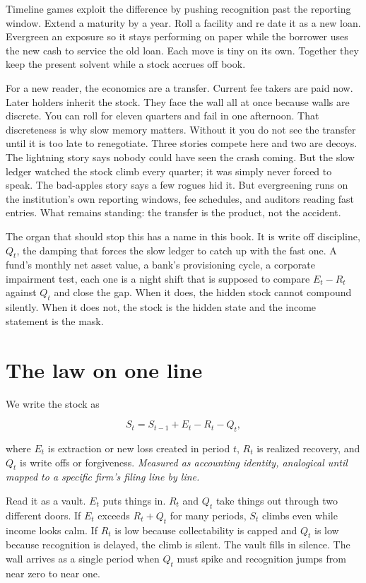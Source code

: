 Timeline games exploit the difference by pushing recognition past the reporting window. Extend a maturity by a year. Roll a facility and re date it as a new loan. Evergreen an exposure so it stays performing on paper while the borrower uses the new cash to service the old loan. Each move is tiny on its own. Together they keep the present solvent while a stock accrues off book.

For a new reader, the economics are a transfer. Current fee takers are paid now. Later holders inherit the stock. They face the wall all at once because walls are discrete. You can roll for eleven quarters and fail in one afternoon. That discreteness is why slow memory matters. Without it you do not see the transfer until it is too late to renegotiate. Three stories compete here and two are decoys. The lightning story says nobody could have seen the crash coming. But the slow ledger watched the stock climb every quarter; it was simply never forced to speak. The bad-apples story says a few rogues hid it. But evergreening runs on the institution's own reporting windows, fee schedules, and auditors reading fast entries. What remains standing: the transfer is the product, not the accident.

The organ that should stop this has a name in this book. It is write off discipline, $Q_t$, the damping that forces the slow ledger to catch up with the fast one. A fund's monthly net asset value, a bank's provisioning cycle, a corporate impairment test, each one is a night shift that is supposed to compare $E_t - R_t$ against $Q_t$ and close the gap. When it does, the hidden stock cannot compound silently. When it does not, the stock is the hidden state and the income statement is the mask.

\section{The law on one line}

We write the stock as

\begin{equation}
S_t = S_{t-1} + E_t - R_t - Q_t,
\label{eq:Stimeline}
\end{equation}

where $E_t$ is extraction or new loss created in period $t$, $R_t$ is realized recovery, and $Q_t$ is write offs or forgiveness. \textit{Measured as accounting identity, analogical until mapped to a specific firm's filing line by line.}

Read it as a vault. $E_t$ puts things in. $R_t$ and $Q_t$ take things out through two different doors. If $E_t$ exceeds $R_t + Q_t$ for many periods, $S_t$ climbs even while income looks calm. If $R_t$ is low because collectability is capped and $Q_t$ is low because recognition is delayed, the climb is silent. The vault fills in silence. The wall arrives as a single period when $Q_t$ must spike and recognition jumps from near zero to near one.

